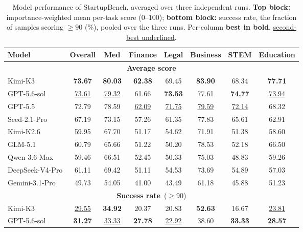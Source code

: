\begin{table}[t]
  \centering
  \small
  \setlength{\tabcolsep}{5pt}
  \renewcommand{\arraystretch}{1.15}
  \caption{Model performance of StartupBench, averaged over three independent runs.
    \textbf{Top block:} importance-weighted mean per-task score ($0$--$100$);
    \textbf{bottom block:} success rate, the fraction of samples scoring $\ge 90$ (\%),
    pooled over the three runs. Per-column \textbf{best in bold},
    \underline{second-best underlined}.}
  \label{tab:leaderboard}
  \begin{tabular}{lccccccc}
    \toprule
    \textbf{Model} & \textbf{Overall}
      & \textbf{Med} & \textbf{Finance} & \textbf{Legal}
      & \textbf{Business} & \textbf{STEM} & \textbf{Education} \\

    \midrule
    \multicolumn{8}{c}{\textbf{Average score}} \\
    \midrule
    Kimi-K3 & \textbf{73.67} & \textbf{80.03} & \textbf{62.38} & 69.45 & \textbf{83.90} & 68.34 & \textbf{77.71} \\

    GPT-5.6-sol & \underline{73.61} & \underline{79.32} & 61.66 & \textbf{73.53} & 77.61 & \textbf{74.77} & \underline{73.94} \\

    GPT-5.5         & 72.79 & 78.59 & \underline{62.09} & \underline{71.75} & \underline{79.59} & \underline{72.14} & 68.32 \\
    Seed-2.1-Pro    & 67.19 & 73.15 & 57.26 & 61.35 & 77.83 & 65.61 & 62.91 \\
    Kimi-K2.6       & 59.95 & 67.70 & 51.17 & 54.62 & 71.91 & 51.38 & 58.60 \\
    GLM-5.1         & 60.79 & 65.66 & 51.22 & 50.20 & 78.53 & 52.18 & 66.50 \\
    Qwen-3.6-Max    & 59.46 & 66.51 & 52.45 & 50.33 & 75.03 & 48.83 & 59.26 \\
    DeepSeek-V4-Pro & 61.11 & 69.42 & 51.11 & 54.53 & 73.69 & 54.89 & 57.03 \\
    Gemini-3.1-Pro  & 49.73 & 54.05 & 41.00 & 43.49 & 61.18 & 45.88 & 51.23 \\
    \midrule
    \multicolumn{8}{c}{\textbf{Success rate}\, ($\ge90$)} \\
    \midrule
    Kimi-K3 & \underline{29.55} & \textbf{34.92} & 20.37 & 20.83 & \textbf{52.63} & 16.67 & \underline{23.81} \\
    GPT-5.6-sol & \textbf{31.27} & \underline{33.33} & \textbf{27.78} & \underline{22.92} & 38.60 & \textbf{33.33} & \textbf{28.57} \\


\end{tabular}
\end{table}
